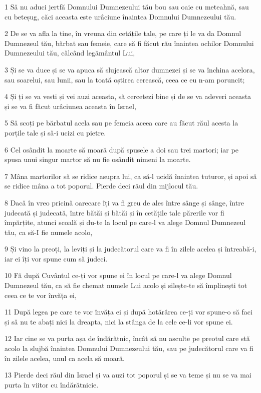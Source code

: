 \par 1 Să nu aduci jertfă Domnului Dumnezeului tău bou sau oaie cu meteahnă, sau cu beteșug, căci aceasta este urâciune înaintea Domnului Dumnezeului tău.
\par 2 De se va afla la tine, în vreuna din cetățile tale, pe care ți le va da Domnul Dumnezeul tău, bărbat sau femeie, care să fi făcut rău înaintea ochilor Domnului Dumnezeului tău, călcând legământul Lui,
\par 3 Și se va duce și se va apuca să slujească altor dumnezei și se va închina acelora, sau soarelui, sau lunii, sau la toată oștirea cerească, ceea ce eu n-am poruncit;
\par 4 Și ți se va vesti și vei auzi aceasta, să cercetezi bine și de se va adeveri aceasta și se va fi făcut urâciunea aceasta în Israel,
\par 5 Să scoți pe bărbatul acela sau pe femeia aceea care au făcut răul acesta la porțile tale și să-i ucizi cu pietre.
\par 6 Cel osândit la moarte să moară după spusele a doi sau trei martori; iar pe spusa unui singur martor să nu fie osândit nimeni la moarte.
\par 7 Mâna martorilor să se ridice asupra lui, ca să-l ucidă înaintea tuturor, și apoi să se ridice mâna a tot poporul. Pierde deci răul din mijlocul tău.
\par 8 Dacă în vreo pricină oarecare îți va fi greu de ales între sânge și sânge, între judecată și judecată, între bătăi și bătăi și în cetățile tale părerile vor fi împărțite, atunci scoală și du-te la locul pe care-l va alege Domnul Dumnezeul tău, ca să-I fie numele acolo,
\par 9 Și vino la preoți, la leviți și la judecătorul care va fi în zilele acelea și întreabă-i, iar ei îți vor spune cum să judeci.
\par 10 Fă după Cuvântul ce-ți vor spune ei în locul pe care-l va alege Domnul Dumnezeul tău, ca să fie chemat numele Lui acolo și silește-te să împlinești tot ceea ce te vor învăța ei,
\par 11 După legea pe care te vor învăța ei și după hotărârea ce-ți vor spune-o să faci și să nu te abați nici la dreapta, nici la stânga de la cele ce-li vor spune ei.
\par 12 Iar cine se va purta așa de îndărătnic, încât să nu asculte pe preotul care stă acolo la slujbă înaintea Domnului Dumnezeului tău, sau pe judecătorul care va fi în zilele acelea, unul ca acela să moară.
\par 13 Pierde deci răul din Israel și va auzi tot poporul și se va teme și nu se va mai purta în viitor cu îndărătnicie.
